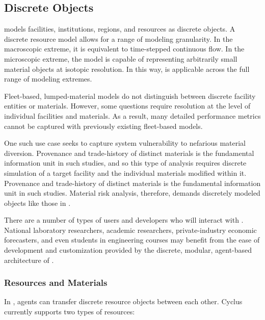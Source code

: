 \subsection{Discrete Objects}

\Cyclus models facilities, institutions, regions, and resources as discrete
objects. A discrete resource model allows for a range of modeling granularity. In the
macroscopic extreme, it is equivalent to time-stepped continuous flow. In the
microscopic extreme, the model is capable of representing arbitrarily small
material objects at isotopic resolution. In this way, \Cyclus is
applicable across the full range of modeling extremes.

Fleet-based, lumped-material models do not distinguish between discrete
facility entities or materials. However, some questions require resolution at the level of
individual facilities and materials.
As a result, many detailed performance
metrics cannot be captured with previously existing fleet-based models.

One such use case seeks to capture system vulnerability to nefarious
material diversion. Provenance and trade-history of distinct materials is the fundamental
information unit in such studies, and so this type of analysis requires
 discrete simulation of a
target facility and the individual materials modified within it.
Provenance and trade-history of distinct materials is the fundamental
information unit in such studies.
Material risk analysis, therefore, demands discretely modeled objects like those
in \Cyclus.

There are a number of types of users and developers who will
interact with \Cyclus. National laboratory researchers,
academic researchers, private-industry economic forecasters, and even students
in engineering courses may benefit from the ease of development and
customization provided by the discrete, modular, agent-based architecture of \Cyclus.

\subsubsection{Resources and Materials}


In \Cyclus, agents can transfer discrete resource objects between each other.
Cyclus currently supports two types of resources:


